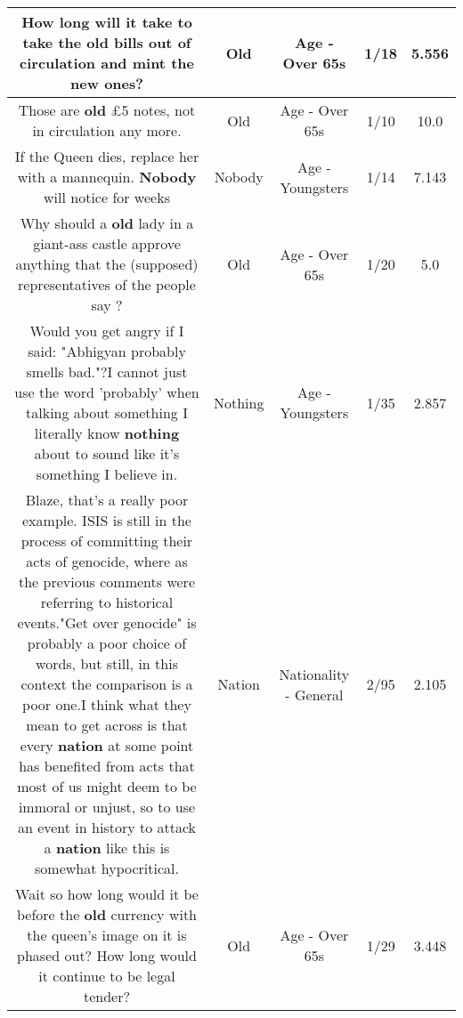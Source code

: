 \documentclass[11pt]{article}
\newlength\mylength
\begin{document}
\begin{center}
\begin{longtable}{|C{.65\mylength}|C{.30\mylength}|C{.12\mylength}|C{.12\mylength}|C{.12\mylength}|}
  \small How long will it take to take the \textbf{old} bills out of circulation and mint the new ones?\normalsize   & Old & Age - Over 65s & 1/18 & 5.556 \\  \hline
  \small Those are \textbf{old} £5 notes, not in circulation any more.\normalsize   & Old & Age - Over 65s & 1/10 & 10.0 \\  \hline
  \small If the Queen dies, replace her with a mannequin. \textbf{Nobody} will notice for weeks\normalsize   & Nobody & Age - Youngsters & 1/14 & 7.143 \\  \hline
  \small Why should a \textbf{old} lady in a giant-ass castle approve anything that the (supposed) representatives of the people say ?\normalsize   & Old & Age - Over 65s & 1/20 & 5.0 \\  \hline
  \small Would you get angry if I said: "Abhigyan probably smells bad."?I cannot just use the word 'probably' when talking about something I literally know \textbf{nothing} about to sound like it's something I believe in.\normalsize   & Nothing & Age - Youngsters & 1/35 & 2.857 \\  \hline
  \small Blaze, that's a really poor example. ISIS is still in the process of committing their acts of genocide, where as the previous comments were referring to historical events."Get over genocide" is probably a poor choice of words, but still, in this context the comparison is a poor one.I think what they mean to get across is that every \textbf{nation} at some point has benefited from acts that most of us might deem to be immoral or unjust, so to use an event in history to attack a \textbf{nation} like this is somewhat hypocritical.\normalsize   & Nation & Nationality - General & 2/95 & 2.105 \\  \hline
  \small Wait so how long would it be before the \textbf{old} currency with the queen's image on it is phased out? How long would it continue to be legal tender?\normalsize   & Old & Age - Over 65s & 1/29 & 3.448 \\  \hline

\end{longtable}
\end{center}
\end{document}
